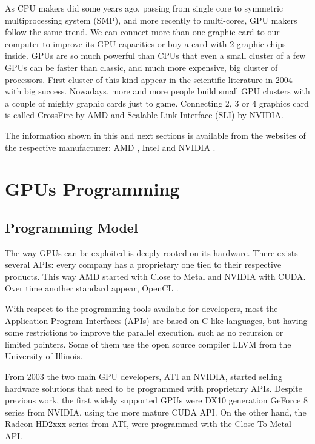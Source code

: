 \documentclass{comjnl}
\begin{document}
As CPU makers did some years ago, passing from single core to symmetric multiprocessing system (SMP), and more recently to multi-cores, GPU makers follow the same trend. We can connect more than one graphic card to our computer to improve its GPU capacities or buy a card with 2 graphic chips inside. GPUs are so much powerful than CPUs that even a small cluster of a few GPUs can be faster than classic, and much more expensive, big cluster of processors. First cluster of this kind appear in the scientific literature in 2004 \cite{10.1109/SC.2004.26} with big success. Nowadays, more and more people build small GPU clusters with a couple of mighty graphic cards just to game. Connecting 2, 3 or 4 graphics card is called CrossFire by AMD and Scalable Link Interface (SLI) by NVIDIA.

The information shown in this and next sections is available from the websites of the respective manufacturer: AMD \cite{amd}, Intel \cite{intel} and NVIDIA \cite{nvidia}.

\section{GPUs Programming}
\label{sec:programming}

\subsection{Programming Model}

The way GPUs can be exploited is deeply rooted on its hardware. There exists several APIs: every company has a proprietary one tied to their respective products. This way AMD started with Close to Metal and NVIDIA with CUDA. Over time another standard appear, OpenCL \cite{opencl}.

With respect to the programming tools available for developers, most the Application Program Interfaces (APIs) are based on C-like languages, but having some restrictions to improve the parallel execution, such as no recursion or limited pointers. Some of them use the open source compiler LLVM \cite{LLVM} from the University of Illinois.

From 2003 the two main GPU developers, ATI an NVIDIA, started selling hardware solutions that need to be programmed with proprietary APIs. Despite previous work, the first widely supported GPUs were DX10 generation GeForce 8 series from NVIDIA, using the more mature CUDA API. On the other hand, the Radeon HD2xxx series from ATI, were programmed with the Close To Metal API. 
\end{document}
